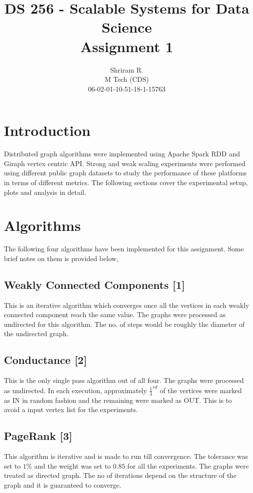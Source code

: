 \documentclass[11pt,a4paper,oneside]{article}
\begin{document}
	\title{DS 256 - Scalable Systems for Data Science \\ Assignment 1}
	\author{Shriram R. \\ M Tech (CDS) \\ 06-02-01-10-51-18-1-15763}
	\maketitle
	
	\section{Introduction}
	Distributed graph algorithms were implemented using Apache Spark RDD and Giraph vertex centric API. Strong and weak scaling experiments were performed using different public graph datasets to study the performance of these platforms in terms of different metrics. The following sections cover the experimental setup, plots and analysis in detail.  
	
	\section{Algorithms}
	The following four algorithms have been implemented for this assignment. Some brief notes on them is provided below,
	
	\subsection{Weakly Connected Components [1]}
	This is an iterative algorithm which converges once all the vertices in each weakly connected component reach the same value. The graphs were processed as undirected for this algorithm. The no. of steps would be roughly the diameter of the undirected graph.
	
	\subsection{Conductance [2]}
	This is the only single pass algorithm out of all four. The graphs were processed as undirected. In each execution, approximately $\frac{1}{3}^{rd}$ of the vertices were marked as IN in random fashion and the remaining were marked as OUT. This is to avoid a input vertex list for the experiments.
	
	\subsection{PageRank [3]}
	This algorithm is iterative and is made to run till convergence. The tolerance was set to $1\%$ and the weight was set to $0.85$ for all the experiments. The graphs were treated as directed graph. The no of iterations depend on the structure of the graph and it is guaranteed to converge. 
	
\end{document}
